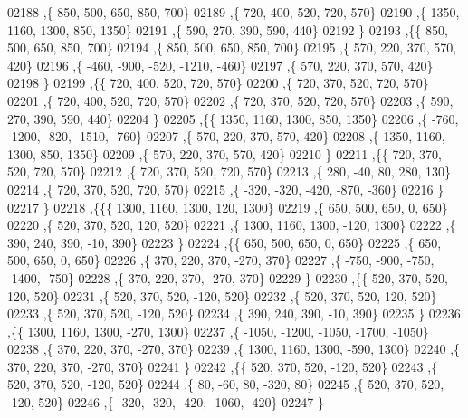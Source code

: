 \begin{DoxyCode}
02188     ,\{   850,   500,   650,   850,   700\}
02189     ,\{   720,   400,   520,   720,   570\}
02190     ,\{  1350,  1160,  1300,   850,  1350\}
02191     ,\{   590,   270,   390,   590,   440\}
02192     \}
02193    ,\{\{   850,   500,   650,   850,   700\}
02194     ,\{   850,   500,   650,   850,   700\}
02195     ,\{   570,   220,   370,   570,   420\}
02196     ,\{  -460,  -900,  -520, -1210,  -460\}
02197     ,\{   570,   220,   370,   570,   420\}
02198     \}
02199    ,\{\{   720,   400,   520,   720,   570\}
02200     ,\{   720,   370,   520,   720,   570\}
02201     ,\{   720,   400,   520,   720,   570\}
02202     ,\{   720,   370,   520,   720,   570\}
02203     ,\{   590,   270,   390,   590,   440\}
02204     \}
02205    ,\{\{  1350,  1160,  1300,   850,  1350\}
02206     ,\{  -760, -1200,  -820, -1510,  -760\}
02207     ,\{   570,   220,   370,   570,   420\}
02208     ,\{  1350,  1160,  1300,   850,  1350\}
02209     ,\{   570,   220,   370,   570,   420\}
02210     \}
02211    ,\{\{   720,   370,   520,   720,   570\}
02212     ,\{   720,   370,   520,   720,   570\}
02213     ,\{   280,   -40,    80,   280,   130\}
02214     ,\{   720,   370,   520,   720,   570\}
02215     ,\{  -320,  -320,  -420,  -870,  -360\}
02216     \}
02217    \}
02218   ,\{\{\{  1300,  1160,  1300,   120,  1300\}
02219     ,\{   650,   500,   650,     0,   650\}
02220     ,\{   520,   370,   520,   120,   520\}
02221     ,\{  1300,  1160,  1300,  -120,  1300\}
02222     ,\{   390,   240,   390,   -10,   390\}
02223     \}
02224    ,\{\{   650,   500,   650,     0,   650\}
02225     ,\{   650,   500,   650,     0,   650\}
02226     ,\{   370,   220,   370,  -270,   370\}
02227     ,\{  -750,  -900,  -750, -1400,  -750\}
02228     ,\{   370,   220,   370,  -270,   370\}
02229     \}
02230    ,\{\{   520,   370,   520,   120,   520\}
02231     ,\{   520,   370,   520,  -120,   520\}
02232     ,\{   520,   370,   520,   120,   520\}
02233     ,\{   520,   370,   520,  -120,   520\}
02234     ,\{   390,   240,   390,   -10,   390\}
02235     \}
02236    ,\{\{  1300,  1160,  1300,  -270,  1300\}
02237     ,\{ -1050, -1200, -1050, -1700, -1050\}
02238     ,\{   370,   220,   370,  -270,   370\}
02239     ,\{  1300,  1160,  1300,  -590,  1300\}
02240     ,\{   370,   220,   370,  -270,   370\}
02241     \}
02242    ,\{\{   520,   370,   520,  -120,   520\}
02243     ,\{   520,   370,   520,  -120,   520\}
02244     ,\{    80,   -60,    80,  -320,    80\}
02245     ,\{   520,   370,   520,  -120,   520\}
02246     ,\{  -320,  -320,  -420, -1060,  -420\}
02247     \}

\end{DoxyCode}
